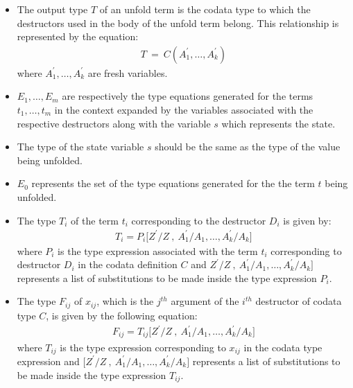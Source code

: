 \documentclass[11pt]{article}
\begin{document}
\begin{itemize}
  \item The output type ${T}$ of an {\sf unfold} term is the codata type to which the destructors used in the body of the {\sf unfold} term belong. This relationship is represented by the equation:
  \begin{align*}
    T~=~C(A_1^\prime,\ldots,A_k^\prime)
  \end{align*}
  where ${A_1^\prime,\ldots,A_k^\prime}$ are fresh variables.
 \item ${E_1,\ldots,E_m}$ are respectively the type equations generated for the terms ${t_1,\ldots,t_m}$ in the context expanded by the variables associated with the respective destructors along with the variable ${s}$ which represents the state.  
 \item The type of the state variable ${s}$ should be the same as the type of the value being unfolded.
 \item ${E_0}$ represents the set of the type equations generated for the the term ${t}$ being unfolded.
 \item The type $T_i$ of the term ${t_i}$ corresponding to the destructor $D_i$ is given by:
   \begin{align*}
    T_i = P_i \Big[Z^\prime/Z~,~A_1^\prime/A_1,\ldots,A_k^\prime/A_k\Big]
  \end{align*}
where ${P_i}$ is the type expression associated with the term ${t_i}$ corresponding to destructor ${D_i}$ in the codata definition ${C}$ and ${Z^\prime/Z~,~A_1^\prime/A_1,\ldots,A_k^\prime/A_k\big]}$ represents a list of substitutions to be made inside the type expression ${P_i}$. 
\item The type ${F_{ij}}$ of ${x_{ij}}$, which is the ${j^{th}}$ argument of the ${i^{th}}$ destructor of codata type ${C}$, is given by the following equation:
\begin{align*}
F_{ij}= T_{ij} \Big[Z^\prime/Z~,~A_1^\prime/A_1,\ldots,A_k^\prime/A_k\Big]
\end{align*}
where ${T_{ij}}$ is the type expression corresponding to ${x_{ij}}$ in the codata type expression and ${\big[Z^\prime/Z~,~A_1^\prime/A_1,\ldots,A_k^\prime/A_k\big]}$ represents a list of substitutions to be made inside the type expression ${T_{ij}}$.
\end{itemize}
\end{document}
